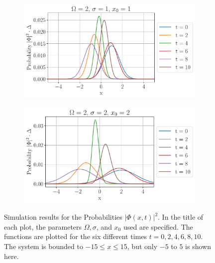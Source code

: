 \begin{figure}[h!]\ContinuedFloat
\centering
     \begin{subfigure}[h]{0.7\textwidth}
         \centering
         \includegraphics[width=\textwidth]{plot/Omega2_sigma1_x01_Probabilities.pdf}
         \caption{}
         
     \end{subfigure}
     
     \begin{subfigure}[h]{1\textwidth}
         \centering
         \includegraphics[width=\textwidth]{plot/Omega2_sigma2_x02_Probabilities.pdf}
         \caption{}
         
     \end{subfigure}
\caption{Simulation results for the Probabilities $|\Phi(x,t)|^2$. In the title of each plot, the parameters $\Omega, \sigma$, and $x_0$ used are specified. The functions are plotted for the six different times $t= 0,2,4,6,8,10$. The system is bounded to $-15 \leq x \leq 15$, but only $-5$ to $5$ is shown here.}
\label{fig: Probabilities}
\end{figure}


